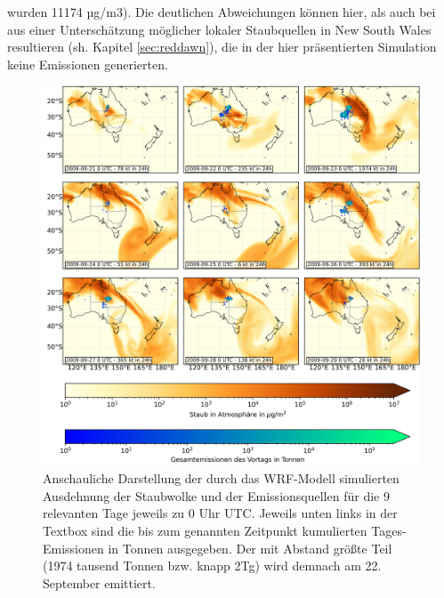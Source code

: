 \documentclass[12pt,a4paper,onecolumn]{scrartcl}
\begin{document}
wurden 11174 µg/m3). Die deutlichen Abweichungen können hier, als auch bei \citet{AlizadehChoobari.2012} aus einer Unterschätzung möglicher lokaler Staubquellen in New South Wales resultieren (sh. Kapitel \ref{sec:reddawn}), die in der hier präsentierten Simulation keine Emissionen generierten.
\begin{figure}
\includegraphics[width=\textwidth]{bilder/dustload.png}
\caption{Anschauliche Darstellung der durch das WRF-Modell simulierten Ausdehnung der Staubwolke und der Emissionsquellen für die 9 relevanten Tage jeweils zu 0 Uhr UTC. Jeweils unten links in der Textbox sind die bis zum genannten Zeitpunkt kumulierten Tages-Emissionen in Tonnen ausgegeben. Der mit Abstand größte Teil (1974 tausend Tonnen bzw. knapp 2Tg) wird demnach am 22. September emittiert. } \label{fig:dustload}
\end{figure}
\end{document}
